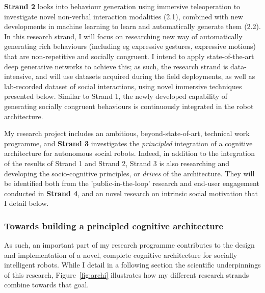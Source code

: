 \textbf{Strand 2} looks into behaviour generation using immersive teleoperation
to investigate novel non-verbal interaction modalities (2.1), combined with
new developments in machine learning to learn and automatically generate them
(2.2). In this research strand, I will focus on researching new way of
automatically generating rich behaviours (including eg expressive gestures,
expressive motions) that are non-repetitive and socially congruent. I intend to
apply state-of-the-art deep generative networks to achieve this; as such, the
research strand is data-intensive, and will use datasets acquired during the
field deployments, as well as lab-recorded dataset of social interactions, using
novel immersive techniques presented below. Similar to Strand 1, the newly
developed capability of generating socially congruent behaviours is continuously
integrated in the robot architecture.


My research project includes an ambitious, beyond-state-of-art, technical work
programme, and \textbf{Strand 3} investigates the \emph{principled} integration
of a cognitive architecture for autonomous social robots.  Indeed, in addition
to the integration of the results of Strand 1 and Strand 2, Strand 3 is also
researching and developing the socio-cognitive principles, or \emph{drives} of
the architecture. They will be identified both from the 'public-in-the-loop'
research and end-user engagement conducted in \textbf{Strand 4}, and an novel
research on intrinsic social motivation that I detail below.

\subsubsection{Towards building a principled cognitive architecture}

As such, an important part of my research programme contributes to the design
and implementation of a novel, complete cognitive architecture for socially
intelligent robots. While I detail in a following section the scientific
underpinnings of this research, Figure~\ref{fig:archi} illustrates how my
different research strands combine towards that goal.

